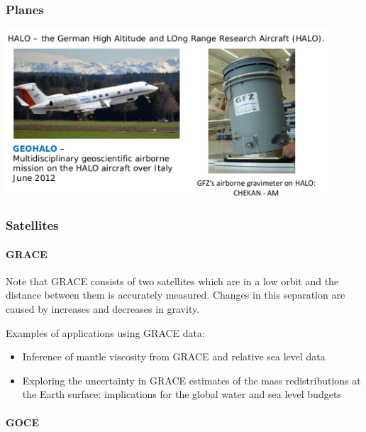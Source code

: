 \subsubsection{Planes}

\begin{center}
\includegraphics[width=12cm]{images/gravity/halo}
\end{center}





\subsubsection{Satellites}

\paragraph{GRACE}

Note that GRACE consists of two satellites
which are in a low orbit and the distance between them
is accurately measured. Changes in this
separation are caused by increases and decreases
in gravity.

Examples of applications using GRACE data:
\begin{itemize}
\item Inference of mantle viscosity from GRACE and relative sea level data \cite{pazw07}
\item Exploring the uncertainty in GRACE estimates of the mass
redistributions at the Earth surface: implications for the global water
and sea level budgets \cite{blml18}
\end{itemize}



\paragraph{GOCE}

